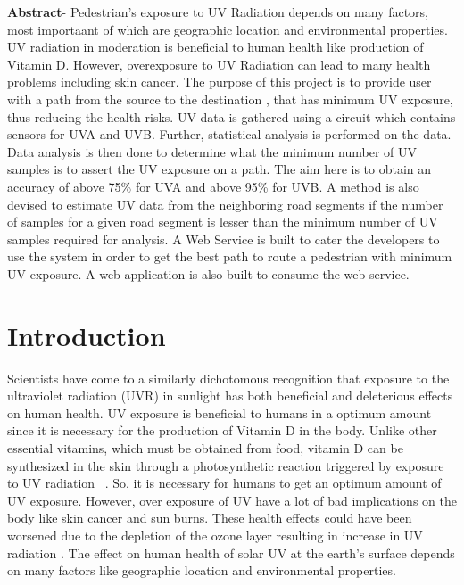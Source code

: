 \documentclass[12pt,fullpage,doublespace]{article}
\begin{document}
\textbf{\normalsize Abstract}- {Pedestrian’s exposure to UV Radiation depends on many factors, most importaant of which are geographic location and environmental properties. UV radiation in moderation is beneficial to human health like production of Vitamin D. However, overexposure to UV Radiation can lead to many health problems including skin cancer. The purpose of this project is to provide user with a path from the source to the destination , that has minimum UV exposure, thus reducing the health risks. UV data is gathered using a circuit which contains sensors for UVA and UVB. Further, statistical analysis is performed on the data. Data analysis is then done to determine what the minimum number of UV samples is to assert the UV exposure on a path. The aim here is to obtain an accuracy of above 75\% for UVA and above 95\% for UVB. A method is also devised to estimate UV data from the neighboring road segments if the number of samples for a given road segment is lesser than the minimum number of UV samples required for analysis. A Web Service is built to cater the developers to use the system in order to get the best path to route a pedestrian with minimum UV exposure. A web application is also built to consume the web service.}\\
\newpage

\section{Introduction}
Scientists have come to a similarly dichotomous recognition that exposure to the ultraviolet radiation (UVR) in sunlight has both beneficial and deleterious effects on human health. UV exposure is beneficial to humans in a optimum amount since it is necessary for the production of Vitamin D in the body. Unlike other essential vitamins, which must be obtained from food, vitamin D can be synthesized in the skin through a photosynthetic reaction triggered by exposure to UV radiation ~\cite{dep1}. So, it is necessary for humans to get an optimum amount of UV exposure. However, over exposure of UV have a lot of bad implications on the body like skin cancer and sun burns. These health effects could have been worsened due to the depletion of the ozone layer resulting in increase in UV radiation \cite{dep2}. The effect on human health of solar UV at the earth’s surface depends on many factors like geographic location and environmental properties.  
\end{document}
